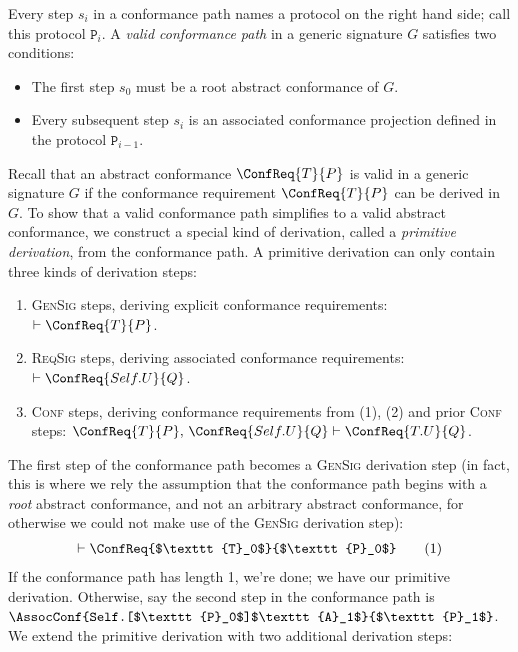 \documentclass[../generics]{subfiles}
\begin{document}
Every step $s_i$ in a conformance path names a protocol on the right hand side; call this protocol $\texttt{P}_i$. A \emph{valid conformance path} in a generic signature $G$ satisfies two conditions:
\begin{itemize}
\item The first step $s_0$ must be a root abstract conformance of $G$.
\item Every subsequent step $s_i$ is an associated conformance projection defined in the protocol $\texttt{P}_{i-1}$.
\end{itemize}

Recall that an abstract conformance $\ConfReq{T}{P}$ is valid in a generic signature $G$ if the conformance requirement $\ConfReq{T}{P}$ can be derived in $G$. To show that a valid conformance path simplifies to a valid abstract conformance, we construct a special kind of derivation, called a \emph{primitive derivation}, from the conformance path. A primitive derivation can only contain three kinds of derivation steps:
\begin{enumerate}
\item {}\textsc{GenSig} steps, deriving explicit conformance requirements: $\vdash \ConfReq{T}{P}$.
\item {}\textsc{ReqSig} steps, deriving associated conformance requirements: $\vdash \ConfReq{Self.U}{Q}$.
\item {}\textsc{Conf} steps, deriving conformance requirements from (1), (2) and prior \textsc{Conf} steps: $\ConfReq{T}{P},\,\ConfReq{Self.U}{Q}\vdash\ConfReq{T.U}{Q}$.
\end{enumerate}
The first step of the conformance path becomes a \textsc{GenSig} derivation step (in fact, this is where we rely the assumption that the conformance path begins with a \emph{root} abstract conformance, and not an arbitrary abstract conformance, for otherwise we could not make use of the \textsc{GenSig} derivation step):
\begin{gather*}
\vdash\ConfReq{$\texttt{T}_0$}{$\texttt{P}_0$}\tag{1}
\end{gather*}
If the conformance path has length 1, we're done; we have our primitive derivation. Otherwise, say the second step in the conformance path is $\AssocConf{Self.[$\texttt{P}_0$]$\texttt{A}_1$}{$\texttt{P}_1$}$. We extend the primitive derivation with two additional derivation steps:
\end{document}
